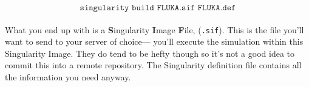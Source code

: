     \[\texttt{singularity build FLUKA.sif FLUKA.def}\]

    \paragraph{}
    What you end up with is a \textbf{S}ingularity \textbf{I}mage \textbf{F}ile, (\texttt{.sif}). This is the file you'll want to send to your server of choice— you'll execute the simulation within this Singularity Image. They do tend to be hefty though so it's not a good idea to commit this into a remote repository. The Singularity definition file contains all the information you need anyway.